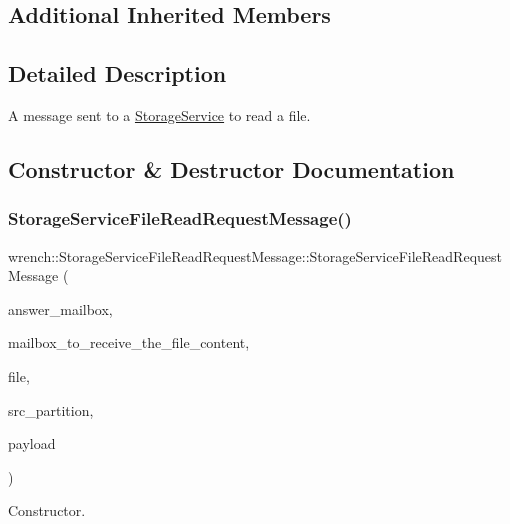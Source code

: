 \subsection*{Additional Inherited Members}


\subsection{Detailed Description}
A message sent to a \hyperlink{classwrench_1_1_storage_service}{Storage\+Service} to read a file. 

\subsection{Constructor \& Destructor Documentation}
\mbox{\label{classwrench_1_1_storage_service_file_read_request_message_a756aa9a511928887dc01029f2f235996}} 
\subsubsection{\texorpdfstring{Storage\+Service\+File\+Read\+Request\+Message()}{StorageServiceFileReadRequestMessage()}}
{\footnotesize\ttfamily wrench\+::\+Storage\+Service\+File\+Read\+Request\+Message\+::\+Storage\+Service\+File\+Read\+Request\+Message (\begin{DoxyParamCaption}\item[{std\+::string}]{answer\+\_\+mailbox,  }\item[{std\+::string}]{mailbox\+\_\+to\+\_\+receive\+\_\+the\+\_\+file\+\_\+content,  }\item[{\hyperlink{classwrench_1_1_workflow_file}{Workflow\+File} $\ast$}]{file,  }\item[{std\+::string \&}]{src\+\_\+partition,  }\item[{double}]{payload }\end{DoxyParamCaption})}



Constructor. 


